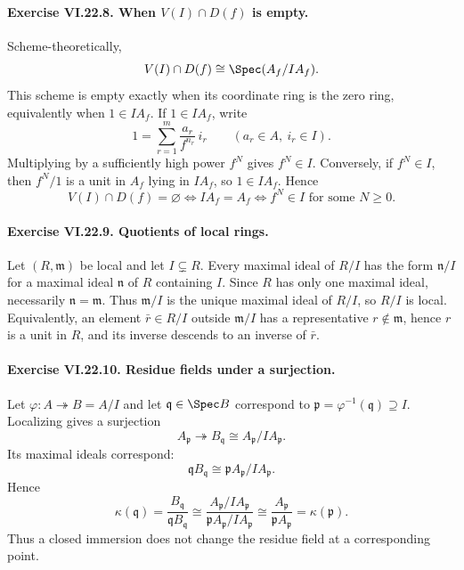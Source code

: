 \paragraph{Exercise VI.22.8. When $V(I)\cap D(f)$ is empty.}
\begin{solution}
Scheme-theoretically,
\[
 V(I)\cap D(f)\cong\Spec(A_f/IA_f).
\]
This scheme is empty exactly when its coordinate ring is the zero ring, equivalently when
$1\in IA_f$.  If $1\in IA_f$, write
\[
 1=\sum_{r=1}^m \frac{a_r}{f^{n_r}}\,i_r
 \qquad (a_r\in A,\ i_r\in I).
\]
Multiplying by a sufficiently high power $f^N$ gives $f^N\in I$.  Conversely, if
$f^N\in I$, then $f^N/1$ is a unit in $A_f$ lying in $IA_f$, so $1\in IA_f$.  Hence
\[
 V(I)\cap D(f)=\varnothing
 \iff IA_f=A_f
 \iff f^N\in I\text{ for some }N\ge0.
\]
\end{solution}

\paragraph{Exercise VI.22.9. Quotients of local rings.}
\begin{solution}
Let $(R,\mathfrak m)$ be local and let $I\subsetneq R$.  Every maximal ideal of $R/I$
has the form $\mathfrak n/I$ for a maximal ideal $\mathfrak n$ of $R$ containing $I$.
Since $R$ has only one maximal ideal, necessarily $\mathfrak n=\mathfrak m$.  Thus
$\mathfrak m/I$ is the unique maximal ideal of $R/I$, so $R/I$ is local.  Equivalently,
an element $\bar r\in R/I$ outside $\mathfrak m/I$ has a representative
$r\notin\mathfrak m$, hence $r$ is a unit in $R$, and its inverse descends to an inverse
of $\bar r$.
\end{solution}

\paragraph{Exercise VI.22.10. Residue fields under a surjection.}
\begin{solution}
Let $\varphi:A\twoheadrightarrow B=A/I$ and let $\mathfrak q\in\Spec B$ correspond to
$\mathfrak p=\varphi^{-1}(\mathfrak q)\supseteq I$.  Localizing gives a surjection
\[
 A_{\mathfrak p}\twoheadrightarrow B_{\mathfrak q}
 \cong A_{\mathfrak p}/IA_{\mathfrak p}.
\]
Its maximal ideals correspond:
\[
 \mathfrak qB_{\mathfrak q}
 \cong \mathfrak pA_{\mathfrak p}/IA_{\mathfrak p}.
\]
Hence
\[
 \kappa(\mathfrak q)
 =\frac{B_{\mathfrak q}}{\mathfrak qB_{\mathfrak q}}
 \cong
 \frac{A_{\mathfrak p}/IA_{\mathfrak p}}
      {\mathfrak pA_{\mathfrak p}/IA_{\mathfrak p}}
 \cong
 \frac{A_{\mathfrak p}}{\mathfrak pA_{\mathfrak p}}
 =\kappa(\mathfrak p).
\]
Thus a closed immersion does not change the residue field at a corresponding point.
\end{solution}

